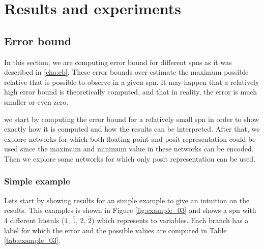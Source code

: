 
\chapter{Results and experiments}
\label{cha:res}

\section{Error bound}

In this section, we are computing error bound for different \glspl{spn} as it was described in \ref{cha:eb}. These error bounds over-estimate the maximum possible relative that is possible to observe in a given \gls{spn}. It may happen that a relatively high error bound is theoretically computed, and that in reality, the error is much smaller or even zero.

we start by computing the error bound for a relatively small \gls{spn} in order to show exactly how it is computed and how the results can be interpreted. After that, we explore networks for which both floating point and posit representation could be used since the maximum and minimum value in these networks can be encoded. Then we explore some networks for which only posit representation can be used.


\subsection{Simple example \label{sec:simple_example}}

Lets start by showing results for an simple example to give an intuition on the results. This examples is shown in Figure \ref{fig:example_03} and shows a \gls{spn} with 4 different literals ($1$, $\bar{1}$, $2$, $\bar{2}$) which represents to variables. Each branch has a label for which the error and the possible values are computed in Table \ref{tab:example_03}. 

